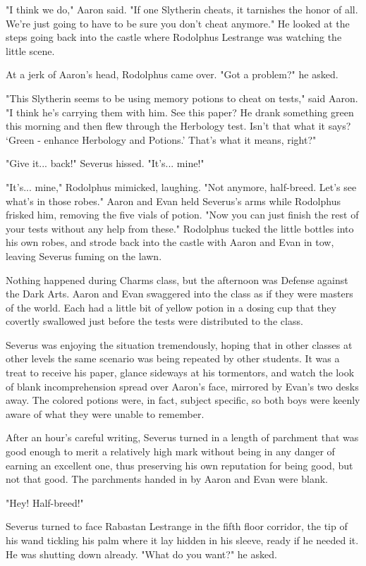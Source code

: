 \documentclass[a4paper,11pt]{article}
\begin{document}
"I think we do," Aaron said. "If one Slytherin cheats, it tarnishes the honor of all. We're just going to have to be sure you don't cheat anymore." He looked at the steps going back into the castle where Rodolphus Lestrange was watching the little scene.

At a jerk of Aaron's head, Rodolphus came over. "Got a problem?" he asked.

"This Slytherin seems to be using memory potions to cheat on tests," said Aaron. "I think he's carrying them with him. See this paper? He drank something green this morning and then flew through the Herbology test. Isn't that what it says? `Green - enhance Herbology and Potions.' That's what it means, right?"

"Give it... back!" Severus hissed. "It's... mine!"

"It's... mine," Rodolphus mimicked, laughing. "Not anymore, half-breed. Let's see what's in those robes." Aaron and Evan held Severus's arms while Rodolphus frisked him, removing the five vials of potion. "Now you can just finish the rest of your tests without any help from these." Rodolphus tucked the little bottles into his own robes, and strode back into the castle with Aaron and Evan in tow, leaving Severus fuming on the lawn.

Nothing happened during Charms class, but the afternoon was Defense against the Dark Arts. Aaron and Evan swaggered into the class as if they were masters of the world. Each had a little bit of yellow potion in a dosing cup that they covertly swallowed just before the tests were distributed to the class.

Severus was enjoying the situation tremendously, hoping that in other classes at other levels the same scenario was being repeated by other students. It was a treat to receive his paper, glance sideways at his tormentors, and watch the look of blank incomprehension spread over Aaron's face, mirrored by Evan's two desks away. The colored potions were, in fact, subject specific, so both boys were keenly aware of what they were unable to remember.

After an hour's careful writing, Severus turned in a length of parchment that was good enough to merit a relatively high mark without being in any danger of earning an excellent one, thus preserving his own reputation for being good, but not that good. The parchments handed in by Aaron and Evan were blank.

"Hey! Half-breed!"

Severus turned to face Rabastan Lestrange in the fifth floor corridor, the tip of his wand tickling his palm where it lay hidden in his sleeve, ready if he needed it. He was shutting down already. "What do you want?" he asked.
\end{document}
